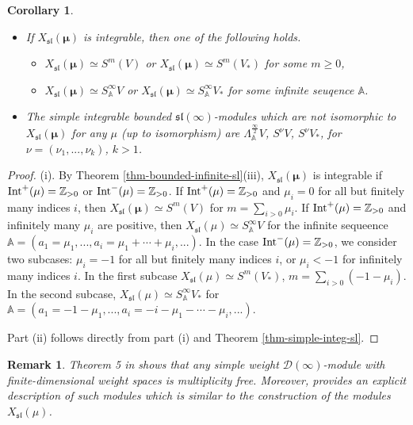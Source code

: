 \documentclass[12pt]{amsart}
\newcommand{\Z}{{\mathbb Z}}
\def\Z{\mathbb{Z}}
\newtheorem{cor}[thm]{Corollary}
\newtheorem{rmk}[thm]{Remark}
\begin{document}
\begin{cor} 
\begin{itemize}
\item[(i)] If  $X_{\mathfrak{sl}} (\boldsymbol{\mu})$ is integrable, then one of the following holds.
\begin{itemize}
\item[(a)] $X_{\mathfrak{sl}} (\boldsymbol{\mu}) \simeq S^{m} (V)$ or $X_{\mathfrak{sl}} (\boldsymbol{\mu}) \simeq S^m (V_*)$ for some $m \geq 0$, 
\item[(b)]$X_{\mathfrak{sl}} (\boldsymbol{\mu}) \simeq S^{\infty}_{\mathbb A} V$ or $X_{\mathfrak{sl}} (\boldsymbol{\mu}) \simeq S^{\infty}_{\mathbb A} V_*$ for some infinite seuqence $\mathbb A$.
\end{itemize}
\item[(ii)] The simple integrable bounded $\mathfrak{sl} (\infty)$-modules which are not isomorphic to  $X_{\mathfrak{sl}} (\boldsymbol{\mu})$ for any $\mu$ (up to isomorphism) are $\Lambda_{\mathbb A}^{\frac{\infty}{2}} V$, $S^{\nu} V$, $S^{\nu}V_*$, for $\nu = (\nu_1,...,\nu_k)$, $k>1$.
\end{itemize}
\end{cor}
\begin{proof} (i). By Theorem \ref{thm-bounded-infinite-sl}(iii), $X_{\mathfrak{sl}} (\boldsymbol{\mu})$ is integrable if ${\rm Int}^+ (\mu) =  \Z_{>0}$ or ${\rm Int}^- (\mu) = \Z_{>0}$. If  ${\rm Int}^+ (\mu) =  \Z_{>0}$ and $\mu_i = 0$ for all but finitely many indices $i$, then $X_{\mathfrak{sl}} (\boldsymbol{\mu}) \simeq S^m (V)$ for $m = \sum_{i>0} \mu_i$.  If  ${\rm Int}^+ (\mu) =  \Z_{>0}$ and infinitely many $\mu_i$ are positive, then $X_{\mathfrak{sl}} (\mu) \simeq S^{\infty}_{\mathbb A}V$ for the infinite sequeence ${\mathbb A} = (a_1 = \mu_1,..., a_i = \mu_1+\cdots +\mu_i,... )$. In the case ${\rm Int}^- (\mu) = \Z_{>0}$, we consider two subcases:  $\mu_i = -1$ for all but finitely many indices $i$, or  $\mu_i<-1$ for infinitely many indices $i$. In the first subcase $X_{\mathfrak{sl}} (\mu) \simeq S^m (V_*)$, $m = \sum_{i>0} (-1 - \mu_i)$. In the second subcase, $X_{\mathfrak{sl}} (\mu) \simeq S^{\infty}_{\mathbb A}V_*$ for  ${\mathbb A} = (a_1 = -1 - \mu_1,..., a_i = -i - \mu_1-\cdots - \mu_i,... )$.

Part (ii) follows directly from part (i) and Theorem \ref{thm-simple-integ-sl}. \end{proof}

\begin{rmk} Theorem 5 in \cite{FGM} shows that any simple  weight ${\mathcal D}(\infty)$-module with finite-dimensional weight spaces is multiplicity free. Moreover, \cite{FGM} provides an explicit description of such modules which is similar to the construction of the modules $X_{\mathfrak{sl}} (\mu)$. 
\end{rmk}
\end{document}
